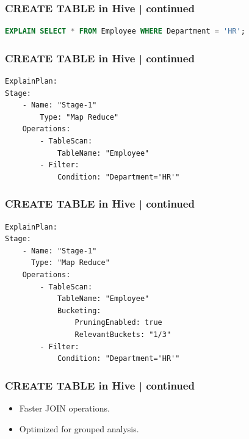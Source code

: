 \begin{frame}[fragile]
\frametitle{CREATE TABLE in Hive | continued}	
\begin{tcolorbox}[colback=white,colframe=black,title= Part 6: Clustering and Sorting | CLUSTERED BY]
\small
\begin{lstlisting}[caption={Simple SQL statement},language=SQL]
EXPLAIN SELECT * FROM Employee WHERE Department = 'HR';
\end{lstlisting}
\end{tcolorbox}
\end{frame}
	
\begin{frame}[fragile]
\frametitle{CREATE TABLE in Hive | continued}	
\begin{tcolorbox}[colback=white,colframe=black,title= Part 6: Clustering and Sorting | CLUSTERED BY]
\small
\begin{lstlisting}[caption={Simplified Explain Plan for Table Without CLUSTERED BY},style=my-yamll]
ExplainPlan:
Stage:    
    - Name: "Stage-1"
        Type: "Map Reduce"
    Operations:
        - TableScan: 
            TableName: "Employee"
        - Filter: 
            Condition: "Department='HR'"
\end{lstlisting}
\end{tcolorbox}
\end{frame}
\begin{frame}[fragile]
\frametitle{CREATE TABLE in Hive | continued}	
\begin{tcolorbox}[colback=white,colframe=black,title= Part 6: Clustering and Sorting | CLUSTERED BY]
\small
\begin{lstlisting}[caption={Simplified Explain Plan for Table with CLUSTERED BY},style=my-yamll]
ExplainPlan:
Stage: 	
    - Name: "Stage-1"
      Type: "Map Reduce"
    Operations:
        - TableScan: 
            TableName: "Employee"
            Bucketing: 
                PruningEnabled: true
                RelevantBuckets: "1/3"
        - Filter: 
            Condition: "Department='HR'"
\end{lstlisting}
\end{tcolorbox}
\end{frame}
\begin{frame}
	\frametitle{CREATE TABLE in Hive | continued}	
	\begin{tcolorbox}[colback=white,colframe=black,title= Part 6: Clustering and Sorting | CLUSTERED BY]
	\begin{itemize}
		\item Faster JOIN operations.
		\item Optimized for grouped analysis.
	\end{itemize}
\end{tcolorbox}	
\end{frame}

